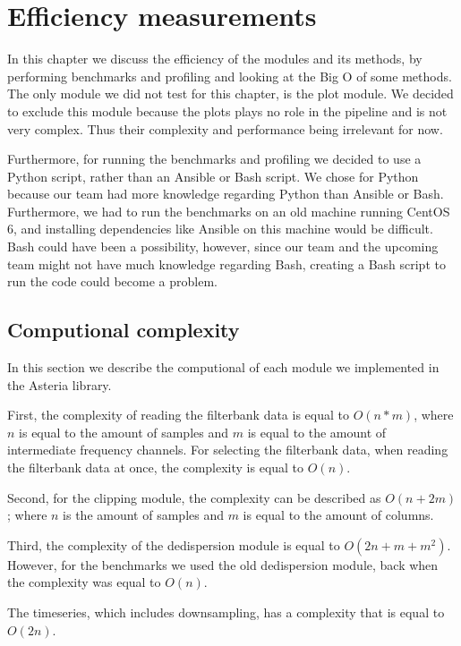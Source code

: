 \documentclass[a4paper,11pt]{report}
\begin{document}
    \newpage

    \section{Efficiency measurements}
    
    In this chapter we discuss the efficiency of the modules and its methods, by performing benchmarks and profiling and looking at the Big O of some methods.
    The only module we did not test for this chapter, is the plot module. We decided to exclude this module because the plots plays no role in the pipeline
    and is not very complex. Thus their complexity and performance being irrelevant for now.

    Furthermore, for running the benchmarks and profiling we decided to use a Python script, rather than an Ansible or Bash script. We chose for Python because
    our team had more knowledge regarding Python than Ansible or Bash. Furthermore, we had to run the benchmarks on an old machine running CentOS 6, and installing
    dependencies like Ansible on this machine would be difficult. Bash could have been a possibility, however, since our team and the upcoming team might not have
    much knowledge regarding Bash, creating a Bash script to run the code could become a problem.

    \subsection{Computional complexity}

    In this section we describe the computional of each module we implemented in the Asteria library.

    First, the complexity of reading the filterbank data is equal to $O(n*m)$, where $n$ is equal to the amount of samples and $m$ is equal to the amount of intermediate
    frequency channels. For selecting the filterbank data, when reading the filterbank data at once, the complexity is equal to $O(n)$.

    Second, for the clipping module, the complexity can be described as $O(n+2m)$; where $n$ is the amount of samples and $m$ is equal to the amount of columns.

    Third, the complexity of the dedispersion module is equal to $O(2n+m+m^2)$. However, for the benchmarks we used the old dedispersion module, back when the complexity
    was equal to $O(n)$.

    The timeseries, which includes downsampling, has a complexity that is equal to $O(2n)$.
\end{document}
